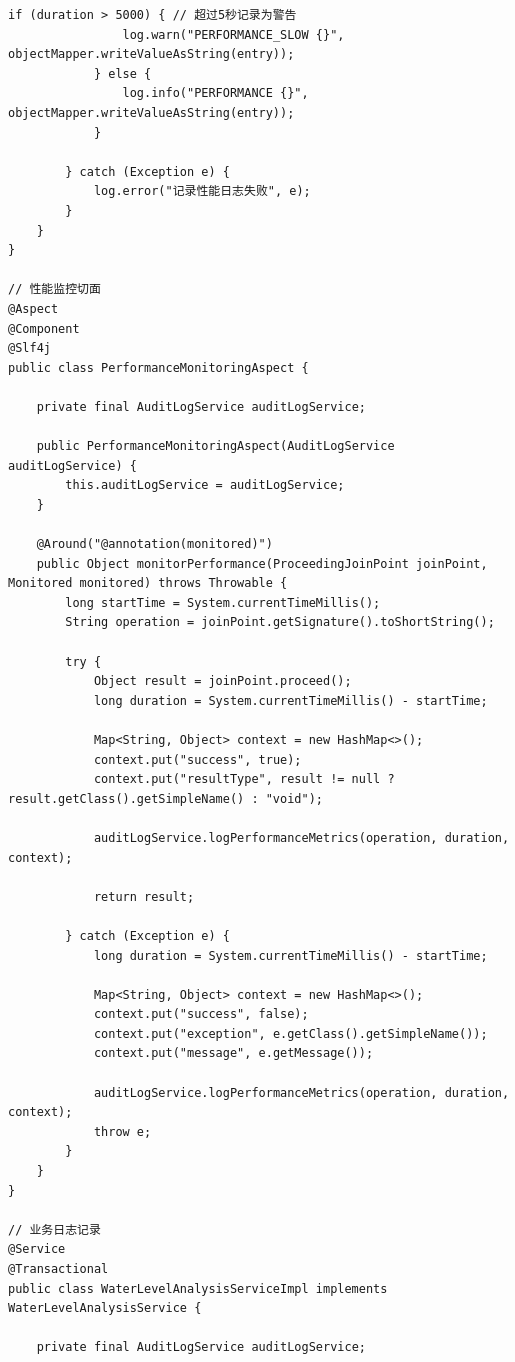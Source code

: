 \begin{lstlisting}[style=java]
            if (duration > 5000) { // 超过5秒记录为警告
                log.warn("PERFORMANCE_SLOW {}", objectMapper.writeValueAsString(entry));
            } else {
                log.info("PERFORMANCE {}", objectMapper.writeValueAsString(entry));
            }
            
        } catch (Exception e) {
            log.error("记录性能日志失败", e);
        }
    }
}

// 性能监控切面
@Aspect
@Component
@Slf4j
public class PerformanceMonitoringAspect {
    
    private final AuditLogService auditLogService;
    
    public PerformanceMonitoringAspect(AuditLogService auditLogService) {
        this.auditLogService = auditLogService;
    }
    
    @Around("@annotation(monitored)")
    public Object monitorPerformance(ProceedingJoinPoint joinPoint, Monitored monitored) throws Throwable {
        long startTime = System.currentTimeMillis();
        String operation = joinPoint.getSignature().toShortString();
        
        try {
            Object result = joinPoint.proceed();
            long duration = System.currentTimeMillis() - startTime;
            
            Map<String, Object> context = new HashMap<>();
            context.put("success", true);
            context.put("resultType", result != null ? result.getClass().getSimpleName() : "void");
            
            auditLogService.logPerformanceMetrics(operation, duration, context);
            
            return result;
            
        } catch (Exception e) {
            long duration = System.currentTimeMillis() - startTime;
            
            Map<String, Object> context = new HashMap<>();
            context.put("success", false);
            context.put("exception", e.getClass().getSimpleName());
            context.put("message", e.getMessage());
            
            auditLogService.logPerformanceMetrics(operation, duration, context);
            throw e;
        }
    }
}

// 业务日志记录
@Service
@Transactional
public class WaterLevelAnalysisServiceImpl implements WaterLevelAnalysisService {
    
    private final AuditLogService auditLogService;
    

\end{lstlisting}
